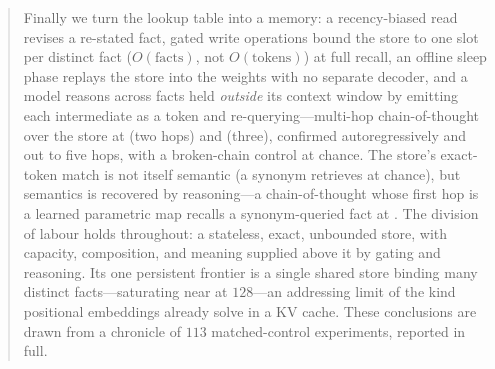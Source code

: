 \begin{abstract}
Finally we turn the lookup table into a memory: a recency-biased read revises a
re-stated fact, gated write operations bound the store to one slot per distinct
fact ($O(\text{facts})$, not $O(\text{tokens})$) at full recall, an offline sleep
phase replays the store into the weights with no separate decoder, and a model
reasons across facts held \emph{outside} its context window by emitting each
intermediate as a token and re-querying---multi-hop chain-of-thought over the store
at  (two hops) and  (three), confirmed autoregressively and
out to five hops, with a broken-chain control at chance. The store's exact-token
match is not itself semantic (a synonym retrieves at chance), but semantics is
recovered by reasoning---a chain-of-thought whose first hop is a learned parametric
map recalls a synonym-queried fact at . The division of labour holds
throughout: a stateless, exact, unbounded store, with capacity, composition, and
meaning supplied above it by gating and reasoning. Its one persistent frontier is a
single shared store binding many distinct facts---saturating near  at
$128$---an addressing limit of the kind positional embeddings already solve in a KV
cache. These conclusions are drawn from a chronicle of $113$ matched-control
experiments, reported in full.
\end{abstract}
